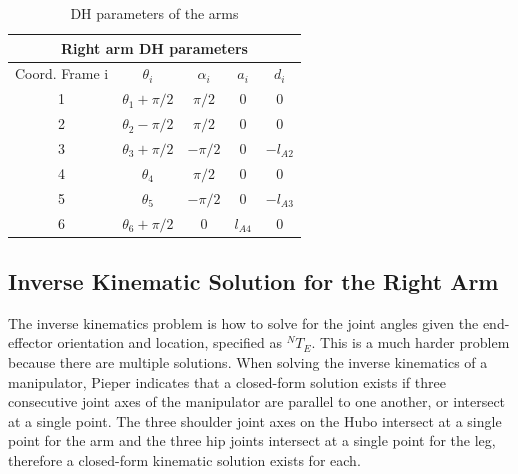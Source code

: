 \documentclass[letterpaper, 10 pt, conference]{IEEEtran}
\begin{document}
\begin{table}[h]
    \centering
    \caption{DH parameters of the arms}
    \begin{tabular}{|c|c|c|c|c|} \hline
    \multicolumn{5}{|c|}{Right arm DH parameters} \\ \hline
    Coord. Frame i &  $\theta_i$              & $\alpha_i$  & $a_i$ & $d_i$ \\ \hline
          1 &  $\theta_1 + \pi/2$  & $\pi/2$  & 0     & 0 \\ \hline
    	  2 &  $\theta_2 - \pi/2$ & $\pi/2$  & 0     & 0 \\ \hline
   	  3 &  $\theta_3 + \pi/2$  & $-\pi/2$ & 0     & $-l_{A2}$ \\ \hline
    	  4 &  $\theta_4$              & $\pi/2$  & 0     & 0 \\ \hline
    	  5 &  $\theta_5$              & $-\pi/2$ & 0     & $-l_{A3}$ \\ \hline
    	  6 &  $\theta_6 + \pi/2$  & $0$   & $l_{A4}$ & 0 \\ \hline
    \end{tabular} \label{tbl:armDH}
\end{table}

\subsection{Inverse Kinematic Solution for the Right Arm}
The inverse kinematics problem is how to solve for the joint angles given the end-effector orientation and location, specified as $^NT_E$. This is a much harder problem because there are multiple solutions. When solving the inverse kinematics of a manipulator, Pieper \cite{Peiper:1968wi} indicates that a closed-form solution exists if three consecutive joint axes of the manipulator are parallel to one another, or intersect at a single point. The three shoulder joint axes on the Hubo intersect at a single point for the arm and the three hip joints intersect at a single point for the leg, therefore a closed-form kinematic solution exists for each. 
\end{document}
